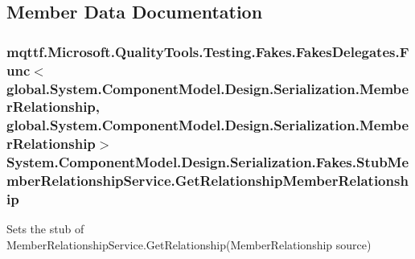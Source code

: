 \subsection{Member Data Documentation}
\hypertarget{class_system_1_1_component_model_1_1_design_1_1_serialization_1_1_fakes_1_1_stub_member_relationship_service_a214719d3c42f243889e056466c6bbbce}{
\subsubsection[{Get\-Relationship\-Member\-Relationship}]{\setlength{\rightskip}{0pt plus 5cm}mqttf.\-Microsoft.\-Quality\-Tools.\-Testing.\-Fakes.\-Fakes\-Delegates.\-Func$<$global.\-System.\-Component\-Model.\-Design.\-Serialization.\-Member\-Relationship, global.\-System.\-Component\-Model.\-Design.\-Serialization.\-Member\-Relationship$>$ System.\-Component\-Model.\-Design.\-Serialization.\-Fakes.\-Stub\-Member\-Relationship\-Service.\-Get\-Relationship\-Member\-Relationship}}\label{class_system_1_1_component_model_1_1_design_1_1_serialization_1_1_fakes_1_1_stub_member_relationship_service_a214719d3c42f243889e056466c6bbbce}


Sets the stub of Member\-Relationship\-Service.\-Get\-Relationship(\-Member\-Relationship source)

